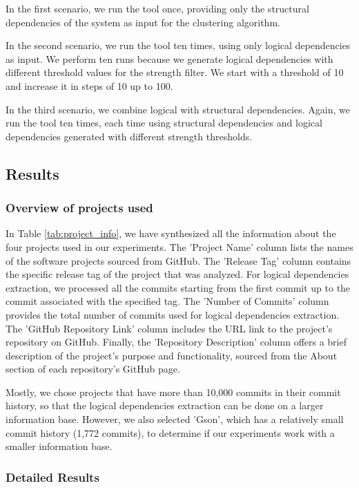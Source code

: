 \documentclass{ieeeaccess}
\begin{document}
In the first scenario, we run the tool once, providing only the structural dependencies of the system as input for the clustering algorithm.

In the second scenario, we run the tool ten times, using only logical dependencies as input. We perform ten runs because we generate logical dependencies with different threshold values for the strength filter. We start with a threshold of 10 and increase it in steps of 10 up to 100.

In the third scenario, we combine logical with structural dependencies. Again, we run the tool ten times, each time using structural dependencies and logical dependencies generated with different strength thresholds.




\subsection{Results}
\label{subsec:results}

\subsubsection{Overview of projects used}


In Table \ref{tab:project_info}, we have synthesized all the information about the four projects used in our experiments. The 'Project Name' column lists the names of the software projects sourced from GitHub. The 'Release Tag' column contains the specific release tag of the project that was analyzed. For logical dependencies extraction, we processed all the commits starting from the first commit up to the commit associated with the specified tag. The 'Number of Commits' column provides the total number of commits used for logical dependencies extraction. The 'GitHub Repository Link' column includes the URL link to the project's repository on GitHub. Finally, the 'Repository Description' column offers a brief description of the project's purpose and functionality, sourced from the About section of each repository's GitHub page.


Mostly, we chose projects that have more than 10,000 commits in their commit history, so that the logical dependencies extraction can be done on a larger information base. However, we also selected 'Gson', which has a relatively small commit history (1,772 commits), to determine if our experiments work with a smaller information base.

\subsubsection{Detailed Results}
\end{document}
